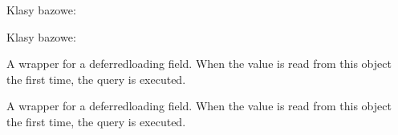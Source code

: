 \documentclass[letterpaper,10pt,polish]{sphinxmanual}
\begin{document}
\begin{fulllineitems}
\begin{fulllineitems}
\label{\detokenize{mainApp:mainApp.models.CreditStorage.DoesNotExist}}
\pysigstartsignatures
{}
\pysigstopsignatures
\sphinxAtStartPar
Klasy bazowe: 

\end{fulllineitems}


\begin{fulllineitems}
\label{\detokenize{mainApp:mainApp.models.CreditStorage.MultipleObjectsReturned}}
\pysigstartsignatures
{}
\pysigstopsignatures
\sphinxAtStartPar
Klasy bazowe: 

\end{fulllineitems}


\begin{fulllineitems}
\label{\detokenize{mainApp:mainApp.models.CreditStorage.icon}}
\pysigstartsignatures
{}
\pysigstopsignatures
\sphinxAtStartPar
A wrapper for a deferred\sphinxhyphen{}loading field. When the value is read from this
object the first time, the query is executed.

\end{fulllineitems}


\begin{fulllineitems}
\label{\detokenize{mainApp:mainApp.models.CreditStorage.id}}
\pysigstartsignatures
{}
\pysigstopsignatures
\sphinxAtStartPar
A wrapper for a deferred\sphinxhyphen{}loading field. When the value is read from this
object the first time, the query is executed.

\end{fulllineitems}



\end{fulllineitems}
\end{document}

